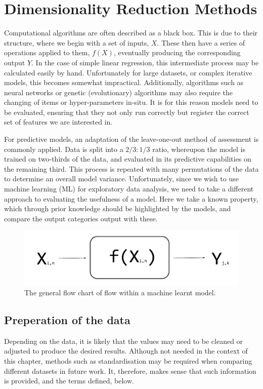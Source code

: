 \section{ Dimensionality Reduction Methods}

Computational algorithms are often described as a black box. This is due to their structure, where we begin with a set of inputs, $X$. These then have a series of operations applied to them, $f(X)$, eventually producing the corresponding output $Y$. In the case of simple linear regression, this intermediate process may be calculated easily by hand. Unfortunately for large datasets, or complex iterative models, this becomes somewhat impractical. Additionally, algorithms such as neural networks or genetic (evolutionary) algorithms may also require the changing of items or hyper-parameters in-situ.
It is for this reason models need to be evaluated, ensuring that they not only run correctly but register the correct set of features we are interested in.

For predictive models, an adaptation of the leave-one-out method of assessment is commonly applied. Data is split into a $2/3:1/3$ ratio, whereupon the model is trained on two-thirds of the data, and evaluated in its predictive capabilities on the remaining third. This process is repeated with many permutations of the data to determine an overall model variance. Unfortunately, since we wish to use machine learning (ML) for exploratory data analysis, we need to take a different approach to evaluating the usefulness of a model. Here we take a known property, which through prior knowledge should be highlighted by the models, and compare the output categories output with these.


\begin{figure}[H]
  \centering
  \includegraphics[width=.5\textwidth]{4fig/xy.pdf}
  \caption{The general flow chart of flow within a machine learnt model.}
  \label{xy}
\end{figure}
\subsection{Preperation of the data}
Depending on the data, it is likely that the values may need to be cleaned or adjusted to produce the desired results. Although not needed in the context of this chapter, methods such as standardisation may be required when comparing different datasets in future work. It, therefore, makes sense that such information is provided, and the terms defined, below.

